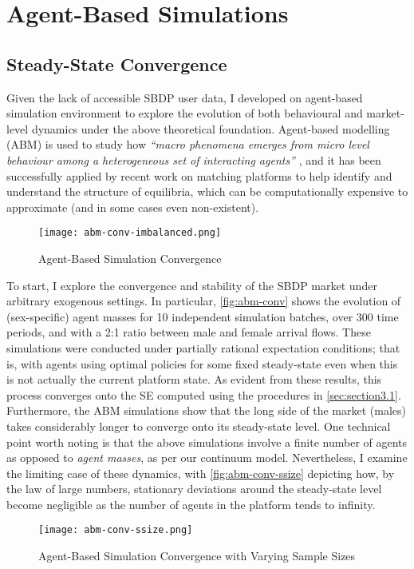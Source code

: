 \section{Agent-Based Simulations}
\label{sec:section4}  
\subsection{Steady-State Convergence}
Given the lack of accessible SBDP user data, I developed on agent-based simulation environment to explore the evolution of both behavioural and market-level dynamics under the above theoretical foundation. 
Agent-based modelling (ABM) is used to study how \textit{``macro phenomena emerges from micro level behaviour among a heterogeneous set of interacting agents''} \citep{janssen2005agent}, and it has been successfully applied by recent work on matching platforms \citep{immorlica2021designing} to help identify and understand the structure of equilibria, which can be computationally expensive to approximate (and in some cases even non-existent). 
\begin{figure}[ht]
    \centering
    \caption{Agent-Based Simulation Convergence}
    \texttt{[image: abm-conv-imbalanced.png]}
    \label{fig:abm-conv} 
\end{figure} 
To start, I explore the convergence and stability of the SBDP market under arbitrary exogenous settings. 
In particular, \autoref{fig:abm-conv} shows the evolution of (sex-specific) agent masses for 10 independent simulation batches, over 300 time periods, and with a 2:1 ratio between male and female arrival flows. 
These simulations were conducted under partially rational expectation conditions; that is, with agents using optimal policies for some fixed steady-state even when this is not actually the current platform state.  
As evident from these results, this process converges onto the SE computed using the procedures in \autoref{sec:section3.1}. 
Furthermore, the ABM simulations show that the long side of the market (males) takes considerably longer to converge onto its steady-state level. 
One technical point worth noting is that the above simulations involve a finite number of agents as opposed to \textit{agent masses}, as per our continuum model.  
Nevertheless, I examine the limiting case of these dynamics, with \autoref{fig:abm-conv-ssize} depicting how, by the law of large numbers, stationary deviations around the steady-state level become negligible as the number of agents in the platform tends to infinity.  
\begin{figure}[ht] 
    \centering
    \caption{Agent-Based Simulation Convergence with Varying Sample Sizes}
    \texttt{[image: abm-conv-ssize.png]}
    \label{fig:abm-conv-ssize}
\end{figure}  
